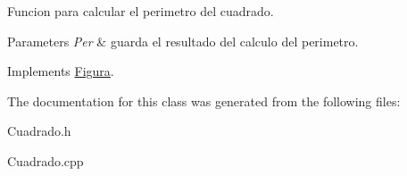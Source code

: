 Funcion para calcular el perimetro del cuadrado. 


\begin{DoxyParams}{Parameters}
{\em Per} & guarda el resultado del calculo del perimetro. \\
\hline
\end{DoxyParams}


Implements \hyperlink{class_figura}{Figura}.



The documentation for this class was generated from the following files\+:\begin{DoxyCompactItemize}
\item 
Cuadrado.\+h\item 
Cuadrado.\+cpp\end{DoxyCompactItemize}
